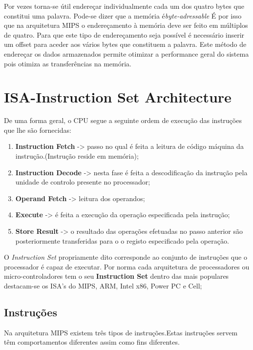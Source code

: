 \documentclass[10pt,a4paper]{book}
\begin{document}
    Por vezes torna-se útil endereçar individualmente cada um dos quatro bytes que constitui uma palavra. Pode-se dizer que a memória é\textit{byte-adressable}
    É por isso que na arquitetura MIPS o endereçamento à memória deve ser feito em múltiplos de quatro.
    Para que este tipo de endereçamento seja possível é necessário inserir um offset para aceder aos vários bytes que constituem a palavra.
    Este método de endereçar os dados armazenados permite otimizar a performance geral do sistema pois otimiza as transferências na memória.


 \chapter{ISA-Instruction Set Architecture}

	De uma forma geral, o CPU segue a seguinte ordem de execução das instruções que lhe são fornecidas:
		\begin{enumerate}
			\item \textbf{Instruction Fetch} -> passo no qual é feita a leitura de código máquina da instrução.(Instrução reside em memória);
			\item \textbf{Instruction Decode} -> nesta fase é feita a descodificação da instrução pela unidade de controlo presente no processador;
			\item \textbf{Operand Fetch} -> leitura dos operandos;
			\item \textbf{Execute} -> é feita a execução da operação especificada pela instrução;
			\item \textbf{Store Result} -> o resultado das operações efetuadas no passo anterior são posteriormente transferidas para o o registo especificado pela operação.
		\end{enumerate}

	O \textit{Instruction Set} propriamente dito corresponde ao conjunto de instruções que o processador é capaz de executar.
	Por norma cada arquitetura de processadores ou micro-controladores tem o seu \textbf{Instruction Set} dentro das mais populares destacam-se os ISA's do MIPS, ARM, Intel x86, Power PC e Cell;


	\section{Instruções}

	Na arquitetura MIPS existem três tipos de instruções.Estas instruções servem têm comportamentos diferentes assim como fins diferentes.
\end{document}
